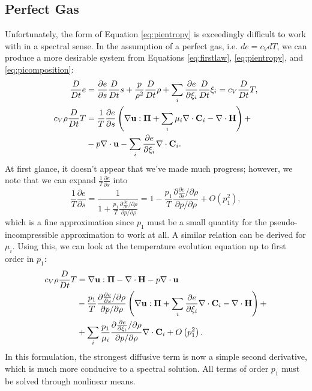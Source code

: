 
\subsection{Perfect Gas} %
\label{sub:perfect}

Unfortunately, the form of Equation \ref{eq:pientropy} is exceedingly difficult to work with in a spectral sense.
In the assumption of a perfect gas, i.e. $de=c_{V}dT$, we can produce a more desirable system from Equations \ref{eq:firstlaw}, \ref{eq:pientropy}, and \ref{eq:picomposition}:
\begin{align}
	\frac{D}{Dt}e&=\frac{\partial e}{\partial s}\frac{D}{Dt}s+\frac{p}{\rho^{2}}\frac{D}{Dt}\rho+\sum_{i}\frac{\partial e}{\partial \xi_{i}}\frac{D}{Dt}\xi_{i}=c_{V}\frac{D}{Dt}T,\\
	c_{V}\rho\frac{D}{Dt}T&=\frac{1}{T}\frac{\partial e}{\partial s}\left(\nabla\mathbf{u}:\mathbf{\Pi}+\sum_{i}\mu_{i}\nabla\cdot\mathbf{C}_{i}-\nabla\cdot{\mathbf{H}}\right)+\nonumber\\
	&-p\nabla\cdot\mathbf{u}-\sum_{i}\frac{\partial e}{\partial \xi_{i}}\nabla\cdot\mathbf{C}_{i}.
\end{align}
At first glance, it doesn't appear that we've made much progress; however, we note that we can expand $\frac{1}{T}\frac{\partial e}{\partial s}$ into
\begin{equation}
	\frac{1}{T}\frac{\partial e}{\partial s}=\frac{1}{1+\frac{p_{1}}{T}\frac{\partial \frac{\partial e}{\partial s}/\partial\rho}{\partial p/\partial\rho}}=1-\frac{p_{1}}{T}\frac{\partial \frac{\partial e}{\partial s}/\partial\rho}{\partial p/\partial\rho}+O\left(p_{1}^{2}\right),
\end{equation}
which is a fine approximation since $p_1$ must be a small quantity for the pseudo-incompressible approximation to work at all.
A similar relation can be derived for $\mu_{i}$.
Using this, we can look at the temperature evolution equation up to first order in $p_{1}$:
\begin{align}
	c_{V}\rho\frac{D}{Dt}T&=\nabla\mathbf{u}:\mathbf{\Pi}-\nabla\cdot{\mathbf{H}}-p\nabla\cdot\mathbf{u}\nonumber\\
	&-\frac{p_{1}}{T}\frac{\partial \frac{\partial e}{\partial s}/\partial\rho}{\partial p/\partial\rho}\left(\nabla\mathbf{u}:\mathbf{\Pi}+\sum_{i}\frac{\partial e}{\partial \xi_{i}}\nabla\cdot\mathbf{C}_{i}-\nabla\cdot{\mathbf{H}}\right)+\nonumber\\
	&+\sum_{i}\frac{p_{1}}{\mu_{i}}\frac{\partial \frac{\partial e}{\partial \xi_{i}}/\partial\rho}{\partial p/\partial\rho}\nabla\cdot\mathbf{C}_{i}+O\left(p_{1}^{2}\right).
\end{align}
In this formulation, the strongest diffusive term is now a simple second derivative, which is much more conducive to a spectral solution.
All terms of order $p_{1}$ must be solved through nonlinear means.

